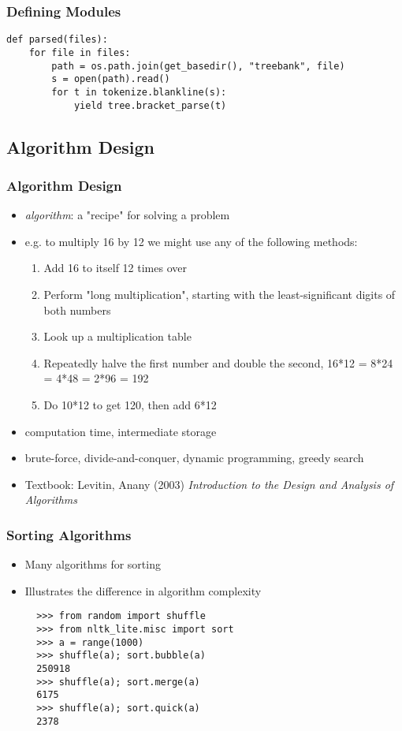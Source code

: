 \documentclass{beamer}             %
\begin{document}
\begin{frame}[fragile]
  \frametitle{Defining Modules}

\begin{verbatim}
def parsed(files):
    for file in files:
        path = os.path.join(get_basedir(), "treebank", file)
        s = open(path).read()
        for t in tokenize.blankline(s):
            yield tree.bracket_parse(t)
\end{verbatim}
\end{frame}

\subsection{Algorithm Design}

\begin{frame}
  \frametitle{Algorithm Design}
  \small

  \begin{itemize}
  \item \textit{algorithm}: a "recipe" for solving a problem
  \item e.g. to multiply 16 by 12 we might use any of the following methods:

    \begin{enumerate}
    \item Add 16 to itself 12 times over
    \item Perform "long multiplication", starting with the least-significant
      digits of both numbers
    \item Look up a multiplication table
    \item Repeatedly halve the first number and double the second,
      16*12 = 8*24 = 4*48 = 2*96 = 192
    \item Do 10*12 to get 120, then add 6*12
    \end{enumerate}

  \item computation time, intermediate storage
  \item brute-force, divide-and-conquer, dynamic programming, greedy search
  \item Textbook: Levitin, Anany (2003) \textit{Introduction to the Design and
      Analysis of Algorithms}
  \end{itemize}
\end{frame}

\begin{frame}[fragile]
\frametitle{Sorting Algorithms}

\begin{itemize}
\item Many algorithms for sorting
\item Illustrates the difference in algorithm complexity

\begin{verbatim}
  >>> from random import shuffle
  >>> from nltk_lite.misc import sort
  >>> a = range(1000)
  >>> shuffle(a); sort.bubble(a)
  250918
  >>> shuffle(a); sort.merge(a)
  6175
  >>> shuffle(a); sort.quick(a)
  2378
\end{verbatim}
\end{itemize}
\end{frame}
\end{document}
